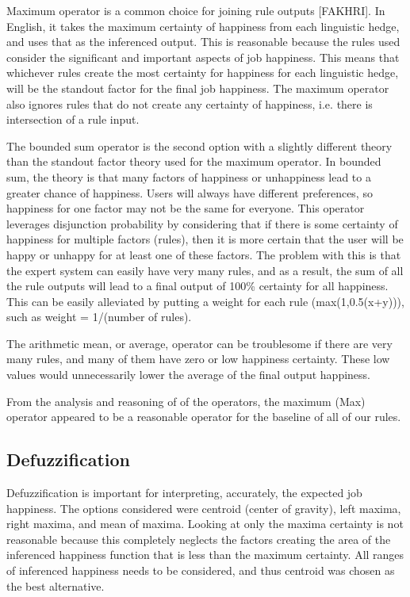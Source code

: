 \documentclass[12pt,fleqn,reqno,letterpaper]{article}
\begin{document}
Maximum operator is a common choice for joining rule outputs [FAKHRI]. In English, it takes the maximum certainty of happiness from each linguistic hedge, and uses that as the inferenced output. This is reasonable because the rules used consider the significant and important aspects of job happiness. This means that whichever rules create the most certainty for happiness for each linguistic hedge, will be the standout factor for the final job happiness. The maximum operator also ignores rules that do not create any certainty of happiness, i.e. there is intersection of a rule input.

The bounded sum operator is the second option with a slightly different theory than the standout factor theory used for the maximum operator. In bounded sum, the theory is that many factors of happiness or unhappiness lead to a greater chance of happiness. Users will always have different preferences, so happiness for one factor may not be the same for everyone. This operator leverages disjunction probability by considering that if there is some certainty of happiness for multiple factors (rules), then it is more certain that the user will be happy or unhappy for at least one of these factors. The problem with this is that the expert system can easily have very many rules, and as a result, the sum of all the rule outputs will lead to a final output of 100\% certainty for all happiness. This can be easily alleviated by putting a weight for each rule (max(1,0.5(x+y))), such as weight = 1/(number of rules).

The arithmetic mean, or average, operator can be troublesome if there are very many rules, and many of them have zero or low happiness certainty. These low values would unnecessarily lower the average of the final output happiness.

From the analysis and reasoning of of the operators, the maximum (Max) operator appeared to be a reasonable operator for the baseline of all of our rules.

\subsection{Defuzzification}
Defuzzification is important for interpreting, accurately, the expected job happiness. The options considered were centroid (center of gravity), left maxima, right maxima, and mean of maxima. Looking at only the maxima certainty is not reasonable because this completely neglects the factors creating the area of the inferenced happiness function that is less than the maximum certainty. All ranges of inferenced happiness needs to be considered, and thus centroid was chosen as the best alternative.
\end{document}
